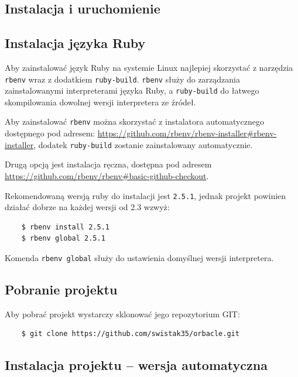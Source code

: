 \documentclass[shortabstract,mgr]{iithesis}
\begin{document}
\begin{appendices}

\chapter{Instalacja i uruchomienie}

\section{Instalacja języka Ruby}

Aby zainstalować język Ruby na systemie Linux najlepiej skorzystać z narzędzia \texttt{rbenv} wraz z dodatkiem \texttt{ruby-build}. \texttt{rbenv} służy do zarządzania zainstalowanymi interpreterami języka Ruby, a \texttt{ruby-build} do łatwego skompilowania dowolnej wersji interpretera ze źródeł.

Aby zainstalować \texttt{rbenv} można skorzystać z instalatora automatycznego dostępnego pod adresem: \url{https://github.com/rbenv/rbenv-installer#rbenv-installer}, dodatek \texttt{ruby-build} zostanie zainstalowany automatycznie.

Drugą opcją jest instalacja ręczna, dostępna pod adresem \url{https://github.com/rbenv/rbenv#basic-github-checkout}.

Rekomendowaną wersją ruby do instalacji jest \texttt{2.5.1}, jednak projekt powinien działać dobrze na każdej wersji od 2.3 wzwyż:

\begin{lstlisting}
    $ rbenv install 2.5.1
    $ rbenv global 2.5.1
\end{lstlisting}

Komenda \texttt{rbenv global} służy do ustawienia domyślnej wersji interpretera.

\section{Pobranie projektu} \label{sec:download-project}

Aby pobrać projekt wystarczy sklonować jego repozytorium GIT:

\begin{lstlisting}
    $ git clone https://github.com/swistak35/orbacle.git
\end{lstlisting}

\section{Instalacja projektu -- wersja automatyczna}


\end{appendices}
\end{document}

